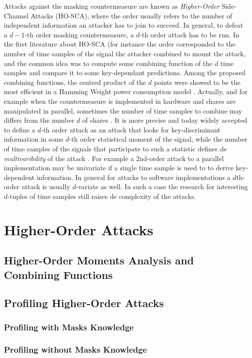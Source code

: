 Attacks against the masking countermeasure are known as \emph{Higher-Order} Side-Channel Attacks (HO-SCA), where the order usually refers to the number of independent information an attacker has to join to succeed. In general, to defeat a $d-1$-th order masking countermeasure, a $d$-th order attack has to be run. In the first literature about HO-SCA (for instance \cite{messerges2000using,Waddle2004,joye2005second,oswald2006practical} the order corresponded to the number of time samples of the signal the attacker combined to mount the attack, and the common idea was to compute some combining function of the $d$ time samples and compare it to some key-dependant predictions. Among the proposed combining functions, the centred product of the $d$ points were showed to be the most efficient in a Hamming Weight power consumption model \cite{DBLP:journals/tc/ProuffRB09}. Actually, and for example when the countermeasure is implemented in hardware and shares are manipulated in parallel, sometimes the number of time samples to combine may differs from the number $d$ of shares \cite{peeters2005improved,standaert2005masking}. It is more precise and today widely accepted to define a $d$-th order attack as an attack that looks for key-discriminant information in some $d$-th order statistical moment of the signal, while the number of time samples of the signals that participate to such a statistic defines de \emph{multivaribility} of the attack \cite{gierlichs2010revisiting,batina2011mutual,carlet2014achieving}. For example a $2$nd-order attack to a parallel implementation may be univariate if a single time sample is used to to derive key-dependent information. In general for attacks to software implementations a $d$th-order attack is usually $d$-variate as well. In such a case the research for interesting $d$-tuples of time samples still raises de complexity of the attacks. 

\section{Higher-Order Attacks}
\subsection{Higher-Order Moments Analysis and Combining Functions}
\subsection{Profiling Higher-Order Attacks}
\subsubsection{Profiling with Masks Knowledge}
\subsubsection{Profiling without Masks Knowledge}

